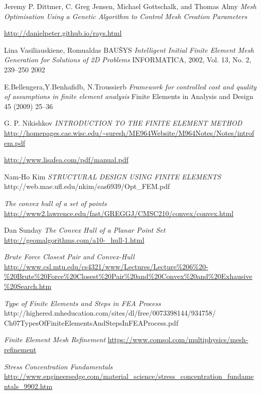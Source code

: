 \begin{changemargin}{\CMwidth}{\CMheight}
\begin{thebibliography}{9}
 Jeremy P. Dittmer, C. Greg Jensen, Michael Gottschalk, and Thomas Almy \emph{Mesh Optimisation Using a Genetic Algorithm to Control Mesh Creation Parameters}

 \url{http://danielpeter.github.io/rays.html}

 Lina Vasiliauskiene, Romualdas BAUŠYS \emph{Intelligent Initial Finite Element Mesh Generation for Solutions of 2D Problems} INFORMATICA, 2002, Vol. 13, No. 2, 239–250 2002

 E.Bellengera,Y.Benhafidb, N.Troussierb \emph{Framework for controlled cost and quality of assumptions in finite element analysis} Finite Elements in Analysis and Design 45 (2009) 25--36

 G. P. Nikishkov \emph{INTRODUCTION TO THE FINITE ELEMENT METHOD} \url{http://homepages.cae.wisc.edu/~suresh/ME964Website/M964Notes/Notes/introfem.pdf}

 \url{http://www.lisafea.com/pdf/manual.pdf}

Nam-Ho Kim \emph{STRUCTURAL DESIGN USING FINITE ELEMENTS} http://web.mae.ufl.edu/nkim/eas6939/Opt\_FEM.pdf


 \emph{The convex hull of a set of points} \url{http://www2.lawrence.edu/fast/GREGGJ/CMSC210/convex/convex.html} 

 Dan Sunday \emph{The Convex Hull of a Planar Point Set} \url{http://geomalgorithms.com/a10-_hull-1.html}

 \emph{Brute Force Closest Pair and Convex-Hull} \url{http://www.csl.mtu.edu/cs4321/www/Lectures/Lecture\%206\%20-\%20Brute\%20Force\%20Closest\%20Pair\%20and\%20Convex\%20and\%20Exhausive\%20Search.htm}

\emph{Type of Finite Elements and Steps in FEA Process}\\
http://highered.mheducation.com/sites/dl/free/0073398144/934758/\\Ch07TypesOfFiniteElementsAndStepsInFEAProcess.pdf 

\emph{Finite Element Mesh Refinement} \url{https://www.comsol.com/multiphysics/mesh-refinement}


 \emph{Stress Concentration Fundamentals} \url{http://www.engineersedge.com/material_science/stress_concentration_fundamentals_9902.htm}



\end{thebibliography}
\end{changemargin}
